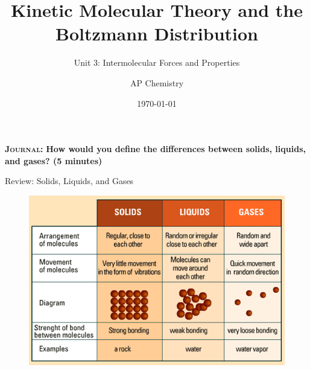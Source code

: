 \documentclass[10pt]{beamer}
\title{Kinetic Molecular Theory and the Boltzmann Distribution}
\subtitle{Unit 3: Intermolecular Forces and Properties}
\date{\today}
\author{AP Chemistry}
\begin{document}
\maketitle

\begin{frame}[standout]
\textbf{\textsc{Journal:}}
 \textbf{How would you define the differences between solids, liquids, and gases? (5 minutes)} 
\end{frame}

\begin{frame}{Review: Solids, Liquids, and Gases}
  \begin{figure}
    \includegraphics[scale=0.6]{3_intermolecular_forces/slg.png}
  \end{figure}
\end{frame}
\end{document}
